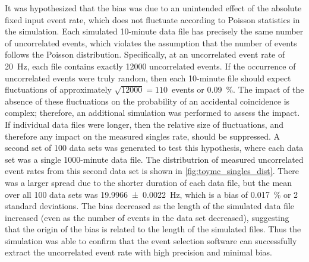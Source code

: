 It was hypothesized that the bias was due to an unintended effect
of the absolute fixed input event rate,
which does not fluctuate according to Poisson statistics in the simulation.
Each simulated 10-minute data file has precisely the same number of uncorrelated events,
which violates the assumption that the number of events follows the Poisson distribution.
Specifically, at an uncorrelated event rate of \SI{20}{\Hz},
each file contains exactly \num{12000} uncorrelated events.
If the occurrence of uncorrelated events were truly random,
then each 10-minute file should expect fluctuations of approximately
$\sqrt{12000} = 110$~events or \SI{0.09}{\percent}.
The impact of the absence of these fluctuations
on the probability of an accidental coincidence is complex;
therefore, an additional simulation was performed
to assess the impact.
If individual data files were longer, then the relative size of fluctuations,
and therefore any impact on the measured singles rate,
should be suppressed.
A second set of 100 data sets was generated to test this hypothesis,
where each data set was a single 1000-minute data file.
The distributrion of measured uncorrelated event rates from this second data set
is shown in \cref{fig:toymc_singles_dist}.
There was a larger spread due to the shorter duration of each data file,
but the mean over all 100 data sets was \SI{19.9966+-0.0022}{\Hz},
which is a bias of \SI{0.017}{\percent} or 2 standard deviations.
The bias decreased as the length of the simulated data file increased
(even as the number of events in the data set decreased),
suggesting that the origin of the bias is related to the length of the simulated files.
Thus the simulation was able to confirm that
the event selection software can successfully extract
the uncorrelated event rate with high precision and minimal bias.


